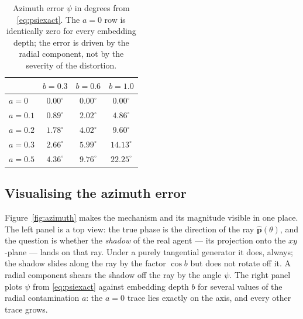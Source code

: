 \documentclass[11pt,a4paper]{article}
\newcommand{\phat}{\hat{\bm{p}}}
\begin{document}
\begin{table}[htbp]
\centering
\caption{Azimuth error $\psi$ in degrees from \eqref{eq:psiexact}. The
$a=0$ row is identically zero for every embedding depth; the error is driven by
the radial component, not by the severity of the distortion.}
\label{tab:psi}
\begin{tabular}{lccc}
\toprule
& $b=0.3$ & $b=0.6$ & $b=1.0$ \\
\midrule
$a = 0$   & $0.00^\circ$ & $0.00^\circ$ & $0.00^\circ$ \\
$a = 0.1$ & $0.89^\circ$ & $2.02^\circ$ & $4.86^\circ$ \\
$a = 0.2$ & $1.78^\circ$ & $4.02^\circ$ & $9.60^\circ$ \\
$a = 0.3$ & $2.66^\circ$ & $5.99^\circ$ & $14.13^\circ$ \\
$a = 0.5$ & $4.36^\circ$ & $9.76^\circ$ & $22.25^\circ$ \\
\bottomrule
\end{tabular}
\end{table}

\subsection{Visualising the azimuth error}

Figure~\ref{fig:azimuth} makes the mechanism and its magnitude visible in one
place. The left panel is a top view: the true phase is the direction of the ray
$\phat(\theta)$, and the question is whether the \emph{shadow} of the real agent
--- its projection onto the $xy$-plane --- lands on that ray. Under a purely
tangential generator it does, always; the shadow slides along the ray by the
factor $\cos b$ but does not rotate off it. A radial component shears the
shadow off the ray by the angle $\psi$. The right panel plots $\psi$ from
\eqref{eq:psiexact} against embedding depth $b$ for several values of the radial
contamination $a$: the $a=0$ trace lies exactly on the axis, and every other
trace grows.
\end{document}
